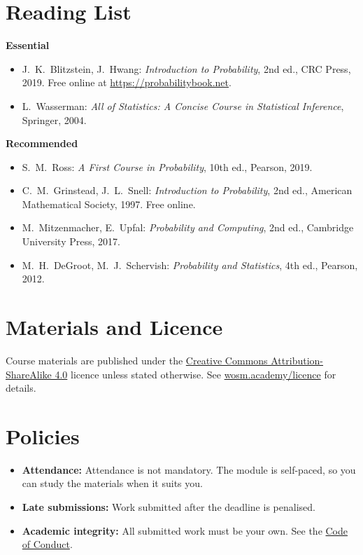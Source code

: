 \documentclass[11pt,a4paper]{article}
\begin{document}
\section{Reading List}
\textbf{Essential}
\begin{itemize}
  \item J.\ K.\ Blitzstein, J.\ Hwang: \textit{Introduction to Probability}, 2nd ed., CRC Press, 2019. Free online at \url{https://probabilitybook.net}.
  \item L.\ Wasserman: \textit{All of Statistics: A Concise Course in Statistical Inference}, Springer, 2004.
\end{itemize}
\textbf{Recommended}
\begin{itemize}
  \item S.\ M.\ Ross: \textit{A First Course in Probability}, 10th ed., Pearson, 2019.
  \item C.\ M.\ Grinstead, J.\ L.\ Snell: \textit{Introduction to Probability}, 2nd ed., American Mathematical Society, 1997. Free online.
  \item M.\ Mitzenmacher, E.\ Upfal: \textit{Probability and Computing}, 2nd ed., Cambridge University Press, 2017.
  \item M.\ H.\ DeGroot, M.\ J.\ Schervish: \textit{Probability and Statistics}, 4th ed., Pearson, 2012.
\end{itemize}

\section{Materials and Licence}
Course materials are published under the
\href{https://creativecommons.org/licenses/by-sa/4.0/}{Creative Commons Attribution-ShareAlike 4.0}
licence unless stated otherwise. See \href{https://wosm.academy/licence/}{wosm.academy/licence} for details.

\section{Policies}
\begin{itemize}
  \item \textbf{Attendance:} Attendance is not mandatory. The module is self-paced, so you can study the materials when it suits you.
  \item \textbf{Late submissions:} Work submitted after the deadline is penalised.
  \item \textbf{Academic integrity:} All submitted work must be your own.
        See the \href{https://wosm.academy/code-of-conduct/}{Code of Conduct}.
\end{itemize}
\end{document}
